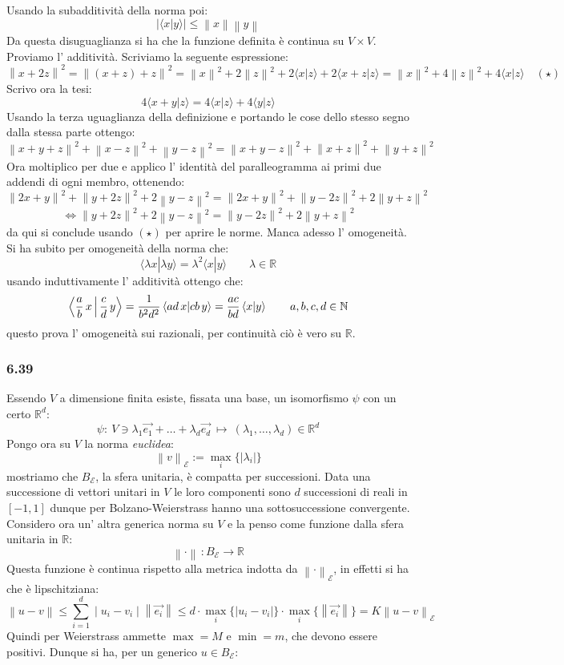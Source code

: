 \documentclass[a4paper,11pt]{article}
\newcommand{\ex}[1]{\subsubsection*{#1}}
\newcommand{\NN}{\mathbb{N}}
\newcommand{\RR}{\mathbb{R}}
\newcommand{\cart}{\times}
\newcommand{\Norm}[1]{\left \| #1 \right\|}
\newcommand{\norm}[1]{\mid{#1}\mid}
\begin{document}
Usando la subadditività della norma poi:
$$
\norm{\langle x|y\rangle} \leq \Norm{x}\Norm{y}
$$
Da questa disuguaglianza si ha che la funzione definita è continua su $V\cart V$.
Proviamo l' additività. Scriviamo la seguente espressione:
$$
\Norm{x+2z}^2=\Norm{(x+z)+z}^2=\Norm{x}^2+2\Norm{z}^2+2\langle x| z\rangle +2\langle x+z|z\rangle=\Norm{x}^2+4\Norm{z}^2+4\langle x| z\rangle\quad (\star)
$$
Scrivo ora la tesi:
$$
4\langle x+y |z\rangle=4\langle x|z \rangle + 4\langle y|z \rangle
$$
Usando la terza uguaglianza della definizione e portando le cose dello stesso segno dalla stessa parte ottengo:
$$
\Norm{x+y+z}^2+\Norm{x-z}^2+\Norm{y-z}^2=\Norm{x+y-z}^2+\Norm{x+z}^2+\Norm{y+z}^2
$$
Ora moltiplico per due e applico l' identità del paralleogramma ai primi due addendi di ogni membro, ottenendo:
$$
\Norm{2x+y}^2+\Norm{y+2z}^2+2\Norm{y-z}^2=\Norm{2x+y}^2+\Norm{y-2z}^2+2\Norm{y+z}^2
$$
$$
\Leftrightarrow \Norm{y+2z}^2+2\Norm{y-z}^2=\Norm{y-2z}^2+2\Norm{y+z}^2
$$
da qui si conclude usando $(\star)$ per aprire le norme.
Manca adesso l' omogeneità. Si ha subito per omogeneità della norma che:
$$
\langle \lambda x|\lambda y\rangle= \lambda ^2 \langle x|y\rangle  \qquad \lambda\in \RR
$$
usando induttivamente l' additività ottengo che:
$$
\Braket{\frac{a}{b}\, x|\frac{c}{d}\, y}=\frac{1}{b^2d^2}\left\langle ad\, x|cb\, y\right\rangle=\frac{ac}{bd}\left\langle x|y\right\rangle\qquad a,b,c,d \in \NN
$$
questo prova l' omogeneità sui razionali, per continuità ciò è vero su $\RR$. 
\ex{6.39} Essendo $V$ a dimensione finita esiste, fissata una base, un isomorfismo $\psi$ con un certo $\RR^d$:
$$
\psi: \ V\ni\lambda_1\vec{e_1}+\ldots+\lambda_d\vec{e_d}\ \mapsto\  (\lambda_1,\ldots,\lambda_d)\in\RR^d
$$
Pongo ora su $V$ la norma  {\it euclidea}:
$$
\Norm{v}_{\mathcal{E}}:=\max_i\{\norm{\lambda_i}\}
$$
mostriamo che $B_{\mathcal{E}}$, la sfera unitaria, è compatta per successioni. Data una successione di vettori unitari in $V$ le loro componenti sono $d$ successioni di reali in $[-1,1]$ dunque per Bolzano-Weierstrass hanno una sottosuccessione convergente. Considero ora un' altra generica norma su $V$ e la penso come funzione dalla sfera unitaria in $\RR$:
$$\Norm{\cdot}\, : B_{\mathcal{E}}\rightarrow \RR$$
Questa funzione è continua rispetto alla metrica indotta da $\Norm{\cdot}_{\mathcal{E}}$, in effetti si ha che è lipschitziana:
$$
\Norm{u-v}\leq\sum_{i=1}^{d}\norm{u_i-v_i}\Norm{\vec{e_i}}\leq d\cdot\max_i\{\norm{u_i-v_i}\}\cdot \max_i\{\Norm{\vec{e_i}}\}=K \Norm{u-v}_{\mathcal{E}}
$$
Quindi per Weierstrass ammette $\max=M$ e $\min=m$, che devono essere positivi. Dunque si ha, per un generico $u\in B_{\mathcal{E}}$: 
\end{document}
